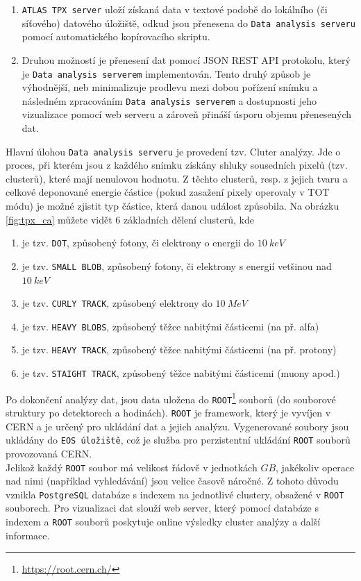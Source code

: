 \begin{description}
		\begin{enumerate}
			\item \texttt{ATLAS TPX server} uloží získaná data v textové podobě do lokálního (či síťového) datového úložiště, odkud jsou přenesena do \texttt{Data analysis serveru} pomocí automatického kopírovacího skriptu.
			\item Druhou možností je přenesení dat pomocí JSON REST API protokolu, který je \texttt{Data analysis serverem} implementován. Tento druhý způsob je výhodnější, neb minimalizuje prodlevu mezi dobou pořízení snímku a následném zpracováním \texttt{Data analysis serverem} a dostupnosti jeho vizualizace pomocí web serveru a zároveň přináší úsporu objemu přenesených dat.
		\end{enumerate}
		Hlavní úlohou \texttt{Data analysis serveru} je provedení tzv. Cluter analýzy. Jde o proces, při kterém jsou z každého snímku získány shluky sousedních pixelů (tzv. clusterů), které mají nenulovou hodnotu. Z těchto clusterů, resp. z jejich tvaru a celkové deponované energie částice (pokud zasažení pixely operovaly v TOT módu) je možné zjistit typ částice, která danou událost způsobila. Na obrázku \ref{fig:tpx_ca} můžete vidět 6 základních dělení clusterů, kde
		 \begin{enumerate}[label=(\alph*)]
			\item je tzv. \texttt{DOT}, způsobený fotony, či elektrony o energii do $10~keV$
			\item je tzv. \texttt{SMALL BLOB}, způsobený fotony, či elektrony s energií vetšinou nad $10~keV$
			\item je tzv. \texttt{CURLY TRACK}, způsobený elektrony do $10~MeV$
			\item je tzv. \texttt{HEAVY BLOBS}, způsobený těžce nabitými částicemi (na př. alfa)
			\item je tzv. \texttt{HEAVY TRACK}, způsobený těžce nabitými částicemi (na př. protony)
			\item je tzv. \texttt{STAIGHT TRACK}, způsobený těžce nabitými částicemi (muony apod.)
		\end{enumerate}
		Po dokončení analýzy dat, jsou data uložena do \texttt{ROOT}\footnote{\url{https://root.cern.ch/}} souborů (do souborové struktury po detektorech a hodinách). \texttt{ROOT} je framework, který je vyvíjen v CERN a je určený pro ukládání dat a jejich analýzu. Vygenerované soubory jsou ukládány do \texttt{EOS úložiště}, což je služba pro perzistentní ukládání \texttt{ROOT} souborů provozovaná CERN.\\
		Jelikož každý \texttt{ROOT} soubor má velikost řádově v jednotkách $GB$, jakékoliv operace nad nimi (například vyhledávání) jsou velice časově náročné. Z tohoto důvodu vznikla \texttt{PostgreSQL} databáze s indexem na jednotlivé clustery, obsažené v \texttt{ROOT} souborech. 
		Pro vizualizaci dat slouží web server, který pomocí databáze s indexem a \texttt{ROOT} souborů poskytuje online výsledky cluster analýzy a další informace.
\end{description}

